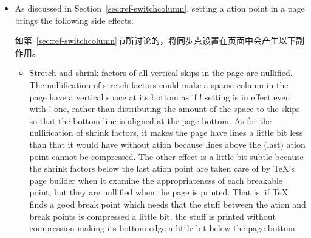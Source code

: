 \begin{itemize}
因此，如果$(p-q)$达到17，\textsf{paracol}将无法继续工作。此外，其他内容也会按照以下方式消耗盒子。
 \begin{itemize}
 \item
 If there are $n$ pages in $q$, $q+1$, \ldots, $p$ having \preenv{} or
 page-wise floats, $n$ boxes are consumed by them.  Similarly, if $m$ pages
 in them have \Scfnote{}s, $m$ boxes are given to them.
 
如果在$q$，$q+1$，\ldots，$p$中有$n$页具有\preenv{}或按页的浮动体，那么它们会消耗$n$个盒子。同样，如果其中$m$页具有\Scfnote{}，那么它们会获得$m$个盒子。
 \item
 If the left (resp.\ right) column has \Mcfnote{}s in $p$ (resp.\ $q$), a box
 is used for them.
 
如果左（右）栏在$p$（$q$）中有\Mcfnote{}，则会为它们使用一个盒子。
 \item
 If the left (resp.\ right) column has $k$ floats to be placed in $p$
 (resp.\ $q$) or to be deferred to $p+1$ (resp.\ $q+1$) or a succeeding page,
 $k$ boxes are reserved for them.

如果左（右）栏在$p$（$q$）中有$k$个浮动体需要放置，或者延迟到$p+1$（$q+1$）或后续页面，则会为它们保留$k$个盒子。
 \end{itemize}

 Therefore, it should be safe to keep $(p-q)$ from exceeding 10 or so
 placing \!\switchcolumn! in both columns fairly frequently.

因此，在两个列中频繁地使用 \!\switchcolumn!，将$(p-q)$保持在不超过10左右应该是安全的。
 \item
 As discussed in Section~\ref{sec:ref-switchcolumn}, setting a \sync{}ation
 point in a page brings the following side effects.

如第~\ref{sec:ref-switchcolumn}节所讨论的，将同步点设置在页面中会产生以下副作用。
 \begin{itemize}
 \item
 Stretch and shrink factors of all vertical skips in the page are
 nullified.  The nullification of stretch factors could make a sparse
 column in the page have a vertical space at its bottom as if
 \!\raggedbottom! setting is in effect even with \!\flushbottom! one,
 rather than distributing the amount of the space to the skips so that the
 bottom line is aligned at the page bottom.  As for the nullification of
 shrink factors, it makes the page have lines a little bit less than that
 it would have without \sync{}ation because lines above the (last)
 \sync{}ation point cannot be compressed.  The other effect is a little bit
 subtle because the shrink factors below the last \sync{}ation point are
 taken care of by \TeX{}'s page builder when it examine the appropriateness
 of each breakable point, but they are nullified when the page is printed.
 That is, if \TeX{} finds a good break point which needs that the stuff
 between the \sync{}ation and break points is compressed a little bit, the
 stuff is printed without compression making its bottom edge a little
 bit below the page bottom.
 

\end{itemize}
\end{itemize}
